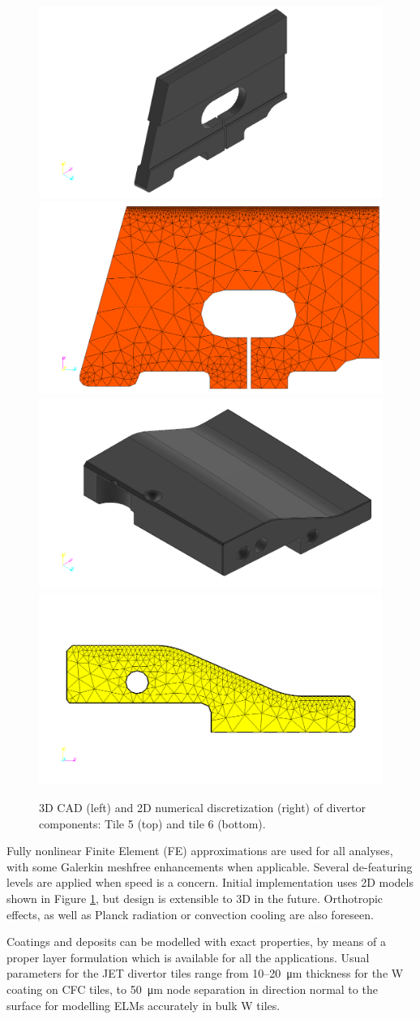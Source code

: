 \begin{figure}[htb]
	\centering
	\includegraphics[width=0.48\linewidth,trim={2cm 0 6cm 0},clip]{images/lamella3D-inverse}
	\includegraphics[width=0.40\linewidth]{images/lamella-mesh-inverse}
	\includegraphics[width=0.50\linewidth]{images/Tile63D-inverse}
	\includegraphics[width=0.48\linewidth]{images/Tile6-mesh-inverse}
	\caption{3D CAD (left) and 2D numerical discretization (right) of divertor components: Tile 5 (top) and tile 6 (bottom).}
	\label{fig:models}
\end{figure}

Fully nonlinear Finite Element (FE) approximations are used for all analyses, with some Galerkin meshfree enhancements \cite{Iglesias2013} when applicable. Several de-featuring levels are applied when speed is a concern. Initial implementation uses 2D models shown in Figure \ref{fig:models}, but design is extensible to 3D in the future. Orthotropic effects, as well as Planck radiation or convection cooling are also foreseen.

Coatings and deposits can be modelled with exact properties, by means of a proper layer formulation which is available for all the applications. Usual parameters for the JET divertor tiles range from 10--\SI{20}{\micro\meter} thickness for the W coating on CFC tiles, to \SI{50}{\micro\meter} node separation in direction normal to the surface for modelling ELMs accurately in bulk W tiles.

